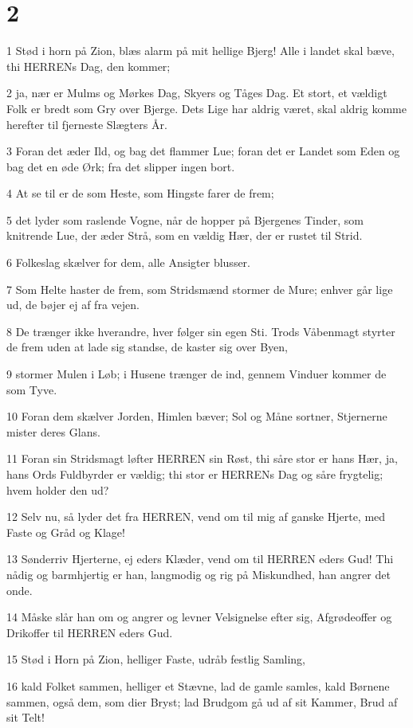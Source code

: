 \chapter{2}

\par 1 Stød i horn på Zion, blæs alarm på mit hellige Bjerg! Alle i landet skal bæve, thi HERRENs Dag, den kommer;
\par 2 ja, nær er Mulms og Mørkes Dag, Skyers og Tåges Dag. Et stort, et vældigt Folk er bredt som Gry over Bjerge. Dets Lige har aldrig været, skal aldrig komme herefter til fjerneste Slægters År.
\par 3 Foran det æder Ild, og bag det flammer Lue; foran det er Landet som Eden og bag det en øde Ørk; fra det slipper ingen bort.
\par 4 At se til er de som Heste, som Hingste farer de frem;
\par 5 det lyder som raslende Vogne, når de hopper på Bjergenes Tinder, som knitrende Lue, der æder Strå, som en vældig Hær, der er rustet til Strid.
\par 6 Folkeslag skælver for dem, alle Ansigter blusser.
\par 7 Som Helte haster de frem, som Stridsmænd stormer de Mure; enhver går lige ud, de bøjer ej af fra vejen.
\par 8 De trænger ikke hverandre, hver følger sin egen Sti. Trods Våbenmagt styrter de frem uden at lade sig standse, de kaster sig over Byen,
\par 9 stormer Mulen i Løb; i Husene trænger de ind, gennem Vinduer kommer de som Tyve.
\par 10 Foran dem skælver Jorden, Himlen bæver; Sol og Måne sortner, Stjernerne mister deres Glans.
\par 11 Foran sin Stridsmagt løfter HERREN sin Røst, thi såre stor er hans Hær, ja, hans Ords Fuldbyrder er vældig; thi stor er HERRENs Dag og såre frygtelig; hvem holder den ud?
\par 12 Selv nu, så lyder det fra HERREN, vend om til mig af ganske Hjerte, med Faste og Gråd og Klage!
\par 13 Sønderriv Hjerterne, ej eders Klæder, vend om til HERREN eders Gud! Thi nådig og barmhjertig er han, langmodig og rig på Miskundhed, han angrer det onde.
\par 14 Måske slår han om og angrer og levner Velsignelse efter sig, Afgrødeoffer og Drikoffer til HERREN eders Gud.
\par 15 Stød i Horn på Zion, helliger Faste, udråb festlig Samling,
\par 16 kald Folket sammen, helliger et Stævne, lad de gamle samles, kald Børnene sammen, også dem, som dier Bryst; lad Brudgom gå ud af sit Kammer, Brud af sit Telt!

